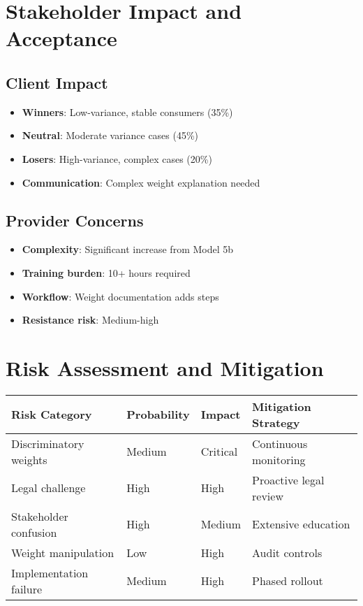 \section{Stakeholder Impact and Acceptance}

\subsection{Client Impact}

\begin{itemize}
    \item \textbf{Winners}: Low-variance, stable consumers (35\%)
    \item \textbf{Neutral}: Moderate variance cases (45\%)
    \item \textbf{Losers}: High-variance, complex cases (20\%)
    \item \textbf{Communication}: Complex weight explanation needed
\end{itemize}

\subsection{Provider Concerns}

\begin{itemize}
    \item \textbf{Complexity}: Significant increase from Model 5b
    \item \textbf{Training burden}: 10+ hours required
    \item \textbf{Workflow}: Weight documentation adds steps
    \item \textbf{Resistance risk}: Medium-high
\end{itemize}

\section{Risk Assessment and Mitigation}

\begin{center}
\begin{tabular}{llll}
\toprule
Risk Category & Probability & Impact & Mitigation Strategy \\
\midrule
Discriminatory weights & Medium & Critical & Continuous monitoring \\
Legal challenge & High & High & Proactive legal review \\
Stakeholder confusion & High & Medium & Extensive education \\
Weight manipulation & Low & High & Audit controls \\
Implementation failure & Medium & High & Phased rollout \\
\bottomrule
\end{tabular}
\end{center}

